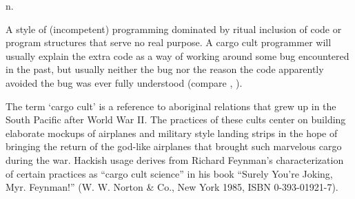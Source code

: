  n.

A style of (incompetent) programming dominated by ritual inclusion of code or
program structures that serve no real purpose. A cargo cult programmer will
usually explain the extra code as a way of working around some bug encountered
in the past, but usually neither the bug nor the reason the code apparently
avoided the bug was ever fully understood (compare , ).

The term `cargo cult' is a reference to aboriginal relations that grew up in the
South Pacific after World War II. The practices of these cults center on
building elaborate mockups of airplanes and military style landing strips in the
hope of bringing the return of the god-like airplanes that brought such
marvelous cargo during the war. Hackish usage derives from Richard Feynman's
characterization of certain practices as ``cargo cult science'' in his book
``Surely You're Joking, Myr. Feynman!'' (W. W. Norton \& Co., New York 1985,
ISBN 0-393-01921-7).


